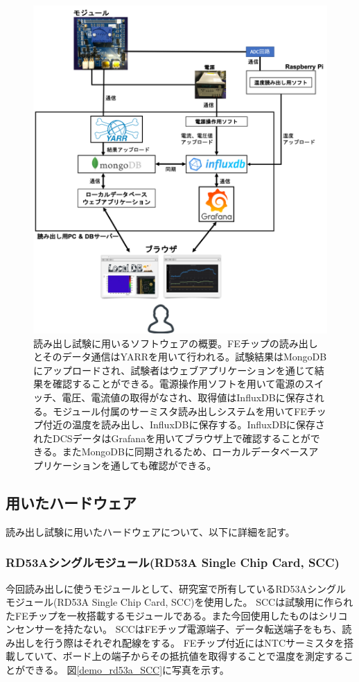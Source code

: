 \begin{figure}[bpt]\centering
\includegraphics[width=14cm]{readout_SW_overview}
\caption[読み出し試験に用いるソフトウェアの概要]{読み出し試験に用いるソフトウェアの概要。FEチップの読み出しとそのデータ通信はYARRを用いて行われる。試験結果はMongoDBにアップロードされ、試験者はウェブアプリケーションを通じて結果を確認することができる。電源操作用ソフトを用いて電源のスイッチ、電圧、電流値の取得がなされ、取得値はInfluxDBに保存される。モジュール付属のサーミスタ読み出しシステムを用いてFEチップ付近の温度を読み出し、InfluxDBに保存する。InfluxDBに保存されたDCSデータはGrafanaを用いてブラウザ上で確認することができる。またMongoDBに同期されるため、ローカルデータベースアプリケーションを通しても確認ができる。}
\label{readout_SW_overview}
\end{figure}

\clearpage
\subsection{用いたハードウェア}
読み出し試験に用いたハードウェアについて、以下に詳細を記す。

\subsubsection{RD53Aシングルモジュール(RD53A Single Chip Card, SCC)\cite{5-10}}
今回読み出しに使うモジュールとして、研究室で所有しているRD53Aシングルモジュール(RD53A Single Chip Card, SCC)を使用した。
SCCは試験用に作られたFEチップを一枚搭載するモジュールである。また今回使用したものはシリコンセンサーを持たない。
SCCはFEチップ電源端子、データ転送端子をもち、読み出しを行う際はそれぞれ配線をする。
FEチップ付近にはNTCサーミスタを搭載していて、ボード上の端子からその抵抗値を取得することで温度を測定することができる。
図\ref{demo_rd53a_SCC}に写真を示す。

